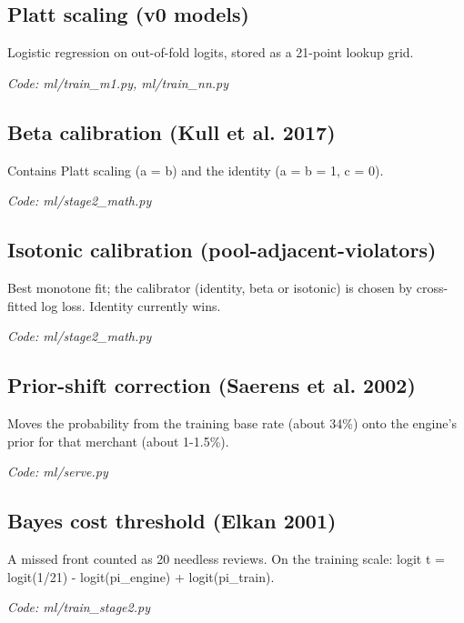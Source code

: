 \documentclass[11pt,a4paper]{article}
\newcommand{\where}[1]{\par{\small\itshape\color{mute}Code: #1}\par}
\begin{document}
\subsection*{Platt scaling (v0 models)}
\par\smallskip\noindent{}\par\smallskip
Logistic regression on out-of-fold logits, stored as a 21-point lookup grid.
\where{ml/train\_m1.py, ml/train\_nn.py}

\subsection*{Beta calibration (Kull et al. 2017)}
\par\smallskip\noindent{}\par\smallskip
Contains Platt scaling (a = b) and the identity (a = b = 1, c = 0).
\where{ml/stage2\_math.py}

\subsection*{Isotonic calibration (pool-adjacent-violators)}
\par\smallskip\noindent{}\par\smallskip
Best monotone fit; the calibrator (identity, beta or isotonic) is chosen by cross-fitted log loss. Identity currently wins.
\where{ml/stage2\_math.py}

\subsection*{Prior-shift correction (Saerens et al. 2002)}
\par\smallskip\noindent{}\par\smallskip
Moves the probability from the training base rate (about 34\%) onto the engine's prior for that merchant (about 1-1.5\%).
\where{ml/serve.py}

\subsection*{Bayes cost threshold (Elkan 2001)}
\par\smallskip\noindent{}\par\smallskip
A missed front counted as 20 needless reviews. On the training scale: logit t = logit(1/21) - logit(pi\_engine) + logit(pi\_train).
\where{ml/train\_stage2.py}
\end{document}
